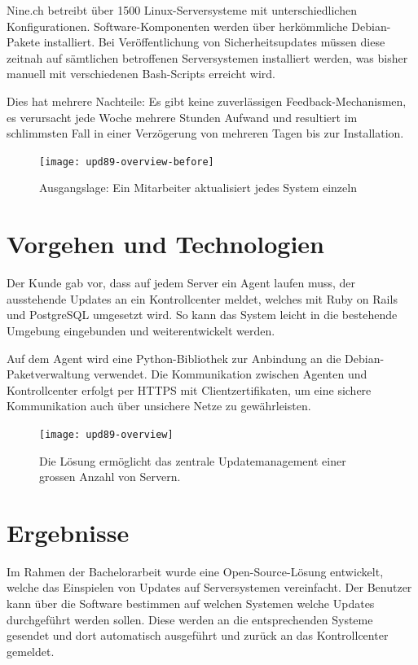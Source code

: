 Nine.ch betreibt über 1500 Linux-Serversysteme mit unterschiedlichen Konfigurationen. Software-Komponenten werden über herkömmliche Debian-Pakete installiert. Bei Veröffentlichung von Sicherheitsupdates müssen diese zeitnah auf sämtlichen betroffenen Serversystemen installiert werden, was bisher manuell mit verschiedenen Bash-Scripts erreicht wird.

Dies hat mehrere Nachteile: Es gibt keine zuverlässigen Feedback-Mechanismen, es verursacht jede Woche mehrere Stunden Aufwand und resultiert im schlimmsten Fall in einer Verzögerung von mehreren Tagen bis zur Installation.

\begin{figure}
  \centering
    \texttt{[image: upd89-overview-before]}
  \caption{Ausgangslage: Ein Mitarbeiter aktualisiert jedes System einzeln}
  \label{fig:overview-before}
\end{figure}

\section*{Vorgehen und Technologien}

Der Kunde gab vor, dass auf jedem Server ein Agent laufen muss, der ausstehende Updates an ein Kontrollcenter meldet, welches mit Ruby on Rails und PostgreSQL umgesetzt wird. So kann das System leicht in die bestehende Umgebung eingebunden und weiterentwickelt werden. 

Auf dem Agent wird eine Python-Bibliothek zur Anbindung an die Debian-Paketverwaltung verwendet. Die Kommunikation zwischen Agenten und Kontrollcenter erfolgt per HTTPS mit Clientzertifikaten, um eine sichere Kommunikation auch über unsichere Netze zu gewährleisten.

\begin{figure}
  \centering
    \texttt{[image: upd89-overview]}
  \caption{Die Lösung ermöglicht das zentrale Updatemanagement einer grossen Anzahl von Servern.}
  \label{fig:overview}
\end{figure}

\section*{Ergebnisse}   

Im Rahmen der Bachelorarbeit wurde eine Open-Source-Lösung entwickelt, welche das Einspielen von Updates auf Serversystemen vereinfacht. Der Benutzer kann über die Software bestimmen auf welchen Systemen welche Updates durchgeführt werden sollen. Diese werden an die entsprechenden Systeme gesendet und dort automatisch ausgeführt und zurück an das Kontrollcenter gemeldet.


